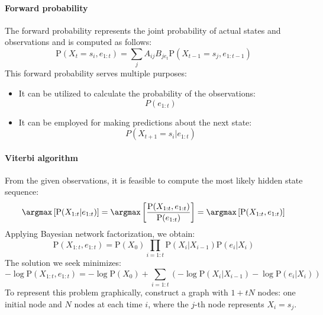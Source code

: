 \paragraph*{Forward probability}
The forward probability represents the joint probability of actual states and observations and is computed as follows:
\[\text{P}(X_t=s_i,e_{1:t})=\sum_j A_{ij}B_{je_t}\text{P}(X_{t-1}=s_j,e_{1:t-1})\]
This forward probability serves multiple purposes:
\begin{itemize}
    \item It can be utilized to calculate the probability of the observations:
        \[P(e_{1:t})\]
    \item It can be employed for making predictions about the next state:
        \[P(X_{t+1}=s_i|e_{1:t})\]
\end{itemize}

\paragraph*{Viterbi algorithm}
From the given observations, it is feasible to compute the most likely hidden state sequence:
\[\argmax\left[\text{P}(X_{1:t}|e_{1:t})\right]=\argmax\left[\dfrac{\text{P}(X_{1:t},e_{1:t})}{\text{P}(e_{1:t})}\right]=\argmax\left[\text{P}(X_{1:t},e_{1:t})\right]\]
Applying Bayesian network factorization, we obtain:
\[\text{P}(X_{1:t},e_{1:t})=\text{P}(X_0)\prod_{i=1:t}\text{P}(X_i|X_{i-1})\text{P}(e_i|X_i)\]
The solution we seek minimizes:
\[-\log\text{P}(X_{1:t},e_{1:t})=-\log\text{P}(X_0)+\sum_{i=1:t}\left(-\log\text{P}(X_i|X_{i-1})-\log\text{P}(e_i|X_i)\right)\]
To represent this problem graphically, construct a graph with $1 + tN$ nodes: one initial node and $N$ nodes at each time $i$, where the $j$-th node represents $X_i=s_j$.
